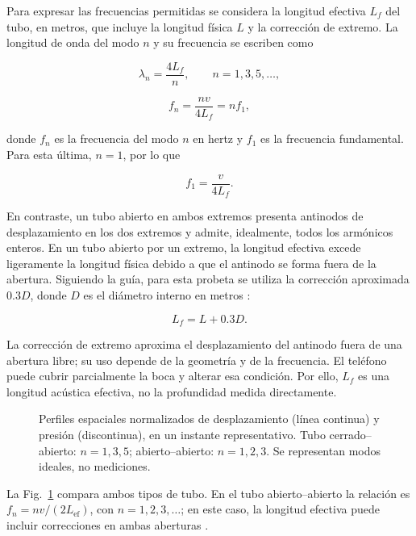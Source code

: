 Para expresar las frecuencias permitidas se considera la longitud efectiva $L_f$ del tubo, en metros, que incluye la longitud física $L$ y la corrección de extremo. La longitud de onda del modo $n$ y su frecuencia se escriben como

\begin{equation}
\lambda_n=\frac{4L_f}{n},\qquad n=1,3,5,\ldots,
\label{eq:longitud_onda_tubo}
\end{equation}

\begin{equation}
f_n=\frac{nv}{4L_f}=nf_1,
\label{eq:frecuencias_tubo}
\end{equation}

donde $f_n$ es la frecuencia del modo $n$ en hertz y $f_1$ es la frecuencia fundamental. Para esta última, $n=1$, por lo que

\begin{equation}
f_1=\frac{v}{4L_f}.
\label{eq:fundamental_tubo}
\end{equation}

En contraste, un tubo abierto en ambos extremos presenta antinodos de desplazamiento en los dos extremos y admite, idealmente, todos los armónicos enteros. En un tubo abierto por un extremo, la longitud efectiva excede ligeramente la longitud física debido a que el antinodo se forma fuera de la abertura. Siguiendo la guía, para esta probeta se utiliza la corrección aproximada $0.3D$, donde $D$ es el diámetro interno en metros \cite{guiauca}:

\begin{equation}
L_f=L+0.3D.
\label{eq:correccion_extremo}
\end{equation}

La corrección de extremo aproxima el desplazamiento del antinodo fuera de una abertura libre; su uso depende de la geometría y de la frecuencia. El teléfono puede cubrir parcialmente la boca y alterar esa condición. Por ello, $L_f$ es una longitud acústica efectiva, no la profundidad medida directamente.

\begin{figure}[!t]
\centering

\caption{Perfiles espaciales normalizados de desplazamiento (línea continua) y presión (discontinua), en un instante representativo. Tubo cerrado--abierto: $n=1,3,5$; abierto--abierto: $n=1,2,3$. Se representan modos ideales, no mediciones.}
\label{fig:modos_tubos}
\end{figure}
La Fig.~\ref{fig:modos_tubos} compara ambos tipos de tubo. En el tubo abierto--abierto la relación es $f_n=nv/(2L_{\mathrm{ef}})$, con $n=1,2,3,\ldots$; en este caso, la longitud efectiva puede incluir correcciones en ambas aberturas \cite{openstax2016}.

